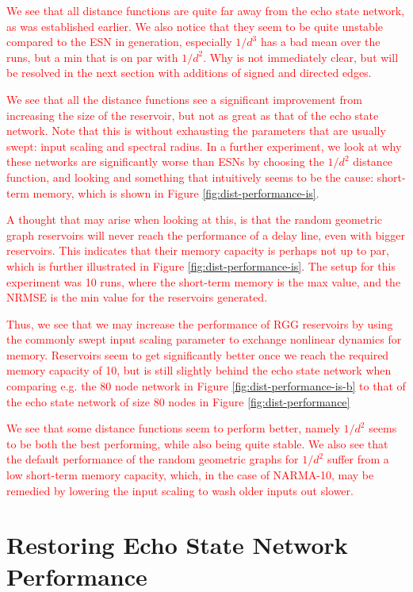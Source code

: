 \textcolor{red}{
  We see that all distance functions are quite far away from the echo state
network, as was established earlier. We also notice that they seem to be quite
unstable compared to the ESN in generation, especially $1/d^3$ has a bad mean
over the runs, but a min that is on par with $1/d^2$. Why is not immediately
clear, but will be resolved in the next section with additions of signed and
directed edges.
}

\textcolor{red}{
  We see that all the distance functions see a significant improvement from
increasing the size of the reservoir, but not as great as that of the echo state
network. Note that this is without exhausting the parameters that are usually
swept: input scaling and spectral radius. In a further experiment, we look at
why these networks are significantly worse than ESNs by choosing the $1/d^2$
distance function, and looking and something that intuitively seems to be the
cause: short-term memory, which is shown in Figure
\ref{fig:dist-performance-is}.
}

\textcolor{red}{
  A thought that may arise when looking at this, is that the random geometric
graph reservoirs will never reach the performance of a delay line, even with
bigger reservoirs. This indicates that their memory capacity is perhaps not up
to par, which is further illustrated in Figure
\ref{fig:dist-performance-is}. The setup for this experiment was 10 runs, where
the short-term memory is the max value, and the NRMSE is the min value for the
reservoirs generated.
}

\textcolor{red}{
  Thus, we see that we may increase the performance of RGG reservoirs by using
the commonly swept input scaling parameter to exchange nonlinear dynamics for
memory. Reservoirs seem to get significantly better once we reach the required
memory capacity of 10, but is still slightly behind the echo state network when
comparing e.g. the 80 node network in Figure \ref{fig:dist-performance-is-b} to
that of the echo state network of size 80 nodes in Figure
\ref{fig:dist-performance}
}

\textcolor{red}{
  We see that some distance functions seem to perform better, namely $1/d^2$
seems to be both the best performing, while also being quite stable. We also see
that the default performance of the random geometric graphs for $1/d^2$ suffer
from a low short-term memory capacity, which, in the case of NARMA-10, may be
remedied by lowering the input scaling to wash older inputs out slower.
}

\section{Restoring Echo State Network Performance}

